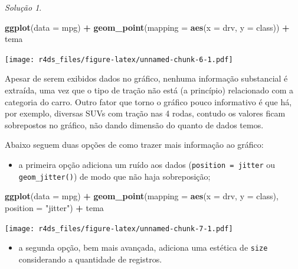 \documentclass[
]{latex/krantz}
\newenvironment{Shaded}{\begin{snugshade}}{\end{snugshade}}
\newcommand{\AttributeTok}[1]{\textcolor[rgb]{0.13,0.29,0.53}{#1}}
\newcommand{\FunctionTok}[1]{\textcolor[rgb]{0.13,0.29,0.53}{\textbf{#1}}}
\newcommand{\NormalTok}[1]{#1}
\newcommand{\SpecialCharTok}[1]{\textcolor[rgb]{0.81,0.36,0.00}{\textbf{#1}}}
\newcommand{\StringTok}[1]{\textcolor[rgb]{0.31,0.60,0.02}{#1}}
\providecommand{\tightlist}{%
  \setlength{\itemsep}{0pt}\setlength{\parskip}{0pt}}
\theoremstyle{definition}
\theoremstyle{definition}
\theoremstyle{definition}
\theoremstyle{definition}
\theoremstyle{remark}
\newtheorem*{solution}{Solução}
\begin{document}
\begin{solution}
\leavevmode

\begin{Shaded}
\begin{Highlighting}[]
\FunctionTok{ggplot}\NormalTok{(}\AttributeTok{data =}\NormalTok{ mpg) }\SpecialCharTok{+}
    \FunctionTok{geom\_point}\NormalTok{(}\AttributeTok{mapping =} \FunctionTok{aes}\NormalTok{(}\AttributeTok{x =}\NormalTok{ drv, }\AttributeTok{y =}\NormalTok{ class)) }\SpecialCharTok{+}
\NormalTok{    tema}
\end{Highlighting}
\end{Shaded}

\texttt{[image: r4ds\_files/figure-latex/unnamed-chunk-6-1.pdf]}

Apesar de serem exibidos dados no gráfico, nenhuma informação substancial é extraída, uma vez que o tipo de tração não está (a princípio) relacionado com a categoria do carro. Outro fator que torno o gráfico pouco informativo é que há, por exemplo, diversas SUVs com tração nas 4 rodas, contudo os valores ficam sobrepostos no gráfico, não dando dimensão do quanto de dados temos.

Abaixo seguem duas opções de como trazer mais informação ao gráfico:

\begin{itemize}
\tightlist
\item
  a primeira opção adiciona um ruído aos dados (\texttt{position\ =\ jitter} ou \texttt{geom\_jitter()}) de modo que não haja sobreposição;
\end{itemize}

\begin{Shaded}
\begin{Highlighting}[]
\FunctionTok{ggplot}\NormalTok{(}\AttributeTok{data =}\NormalTok{ mpg) }\SpecialCharTok{+}
    \FunctionTok{geom\_point}\NormalTok{(}\AttributeTok{mapping =} \FunctionTok{aes}\NormalTok{(}\AttributeTok{x =}\NormalTok{ drv, }\AttributeTok{y =}\NormalTok{ class), }\AttributeTok{position =} \StringTok{"jitter"}\NormalTok{) }\SpecialCharTok{+}
\NormalTok{    tema}
\end{Highlighting}
\end{Shaded}

\texttt{[image: r4ds\_files/figure-latex/unnamed-chunk-7-1.pdf]}

\begin{itemize}
\tightlist
\item
  a segunda opção, bem mais avançada, adiciona uma estética de \texttt{size} considerando a quantidade de registros.
\end{itemize}


\end{solution}
\end{document}
